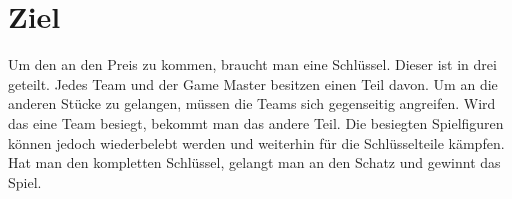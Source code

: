 \documentclass[10pt]{book}
\begin{document}
	\chapter{Ziel}
	Um den an den Preis zu kommen, braucht man eine Schlüssel. Dieser ist in drei  geteilt. Jedes Team und der Game Master besitzen einen Teil davon. Um an die anderen Stücke zu gelangen, müssen die Teams sich gegenseitig angreifen. Wird das eine Team besiegt, bekommt man das andere Teil. Die besiegten Spielfiguren können jedoch wiederbelebt werden und weiterhin für die Schlüsselteile kämpfen. Hat man den kompletten Schlüssel, gelangt man an den Schatz und gewinnt das Spiel.
\end{document}

